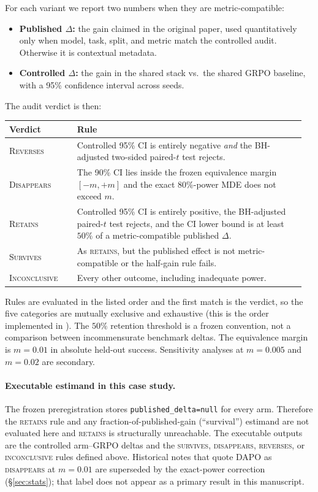 \documentclass[11pt]{article}
\newcommand{\verdict}[1]{\textsc{#1}}
\begin{document}
For each variant we report two numbers when they are metric-compatible:
\begin{itemize}[leftmargin=1.4em, itemsep=2pt]
  \item \textbf{Published $\Delta$:} the gain claimed in the original paper,
    used quantitatively only when model, task, split, and metric match the
    controlled audit. Otherwise it is contextual metadata.
  \item \textbf{Controlled $\Delta$:} the gain in the shared stack vs.\ the
    shared GRPO baseline, with a 95\% confidence interval across seeds.
\end{itemize}
The audit verdict is then:
\begin{center}
\small
\begin{tabular}{@{}p{0.22\linewidth}p{0.74\linewidth}@{}}
\toprule
\textbf{Verdict} & \textbf{Rule}\\
\midrule
\verdict{Reverses} & Controlled 95\% CI is entirely negative \emph{and} the
  BH-adjusted two-sided paired-$t$ test rejects.\\
\verdict{Disappears} & The 90\% CI lies inside the frozen equivalence margin
  $[-m,+m]$ and the exact 80\%-power MDE does not exceed $m$.\\
\verdict{Retains} & Controlled 95\% CI is entirely positive, the BH-adjusted
  paired-$t$ test rejects, and the CI lower bound is at least $50\%$ of a
  metric-compatible published $\Delta$.\\
\verdict{Survives} & As \verdict{retains}, but the published effect is not
  metric-compatible or the half-gain rule fails.\\
\verdict{Inconclusive} & Every other outcome, including inadequate power.\\
\bottomrule
\end{tabular}
\end{center}
Rules are evaluated in the listed order and the first match is the verdict, so
the five categories are mutually exclusive and exhaustive (this is the order
implemented in ). The $50\%$ retention threshold is a
frozen convention, not a comparison between incommensurate benchmark deltas.
The equivalence margin is $m=0.01$ in absolute held-out success. Sensitivity
analyses at $m=0.005$ and $m=0.02$ are secondary.

\begin{sloppypar}
\paragraph{Executable estimand in this case study.} The frozen
preregistration stores \texttt{published\_delta=null} for every arm. Therefore
the \verdict{retains} rule and any fraction-of-published-gain (``survival'')
estimand are not evaluated here and \verdict{retains} is structurally
unreachable. The executable outputs are the controlled arm--GRPO deltas and
the \verdict{survives}, \verdict{disappears}, \verdict{reverses}, or
\verdict{inconclusive} rules defined above. Historical notes that quote DAPO as
\verdict{disappears} at $m=0.01$ are superseded by the exact-power correction
(\S\ref{sec:stats}); that label does not appear as a primary result in this
manuscript.
\end{sloppypar}
\end{document}
